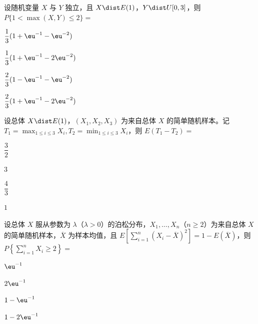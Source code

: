 \begin{question}[index=8]
设随机变量 $X$ 与 $Y$ 独立，且 $X\dist E(1)$，$Y\dist U[0,3]$，则 $P\{1<\max(X,Y)\leq2\}=$
\begin{choices}[columns=2]
\item $\dfrac13(1+\eu^{-1}-\eu^{-2})$
\item $\dfrac13(1+\eu^{-1}-2\eu^{-2})$
\item $\dfrac23(1-\eu^{-1}-\eu^{-2})$
\item $\dfrac23(1+\eu^{-1}-2\eu^{-2})$
\end{choices}
\end{question}
\QuestionBreak

\begin{question}[index=9]
设总体 $X\dist E(1)$，$(X_1,X_2,X_3)$ 为来自总体 $X$ 的简单随机样本。记 $\displaystyle T_1=\max_{1\leq i\leq3}X_i,$\quad \allowbreak\mbox{$\displaystyle T_2=\min_{1\leq i\leq3}X_i$}，则 $E(T_1-T_2)=$
\begin{choices}[columns=4]
\item $\dfrac32$
\item $3$
\item $\dfrac43$
\item $1$
\end{choices}
\end{question}
\QuestionBreak

\begin{question}[index=10]
设总体 $X$ 服从参数为 $\lambda$（$\lambda>0$）的泊松分布，$X_1,\dots,X_n$（$n\geq2$）为来自总体 $X$ 的\allowbreak\mbox{简单随机样本}，$\overline X$ 为样本均值，且 $\displaystyle E\left[\sum_{i=1}^n(X_i-\overline X)^2\right]=1-E(\overline X)$，则 $\displaystyle P\left\{\sum_{i=1}^n X_i\geq2\right\}=$
\begin{choices}[columns=4]
\item $\eu^{-1}$
\item $2\eu^{-1}$
\item $1-\eu^{-1}$
\item $1-2\eu^{-1}$
\end{choices}
\end{question}
